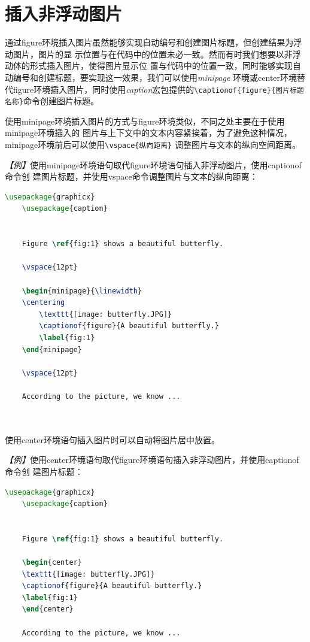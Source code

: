 \section{插入非浮动图片}

通过figure环境插入图片虽然能够实现自动编号和创建图片标题，但创建结果为浮动图片，图片的显
示位置与在代码中的位置未必一致。然而有时我们想要以非浮动体的形式插入图片，使得图片显示位
置与代码中的位置一致，同时能够实现自动编号和创建标题，要实现这一效果，我们可以使用\emph{minipage}
环境或center环境替代figure环境插入图片，同时使用\emph{caption}宏包提供的\texttt{\textbackslash{}captionof\{figure\}\{图片标题名称\}}命令创建图片标题。

使用minipage环境插入图片的方式与figure环境类似，不同之处主要在于使用minipage环境插入的
图片与上下文中的文本内容紧挨着，为了避免这种情况，minipage环境前后可以使用\texttt{\textbackslash{}vspace\{纵向距离\}}
调整图片与文本的纵向空间距离。

\emph{【例】}使用minipage环境语句取代figure环境语句插入非浮动图片，使用captionof命令创
建图片标题，并使用vspace命令调整图片与文本的纵向距离：
\begin{lstlisting}[language=TeX]
    \usepackage{graphicx}
    \usepackage{caption}
    

    Figure \ref{fig:1} shows a beautiful butterfly.

    \vspace{12pt}

    \begin{minipage}{\linewidth}
    \centering
        \texttt{[image: butterfly.JPG]}
        \captionof{figure}{A beautiful butterfly.}
        \label{fig:1}
    \end{minipage}

    \vspace{12pt}

    According to the picture, we know ...

    
\end{lstlisting}

使用center环境语句插入图片时可以自动将图片居中放置。

\emph{【例】}使用center环境语句取代figure环境语句插入非浮动图片，并使用captionof命令创
建图片标题：
\begin{lstlisting}[language=TeX]
    \usepackage{graphicx}
    \usepackage{caption}
    

    Figure \ref{fig:1} shows a beautiful butterfly.

    \begin{center}
    \texttt{[image: butterfly.JPG]}
    \captionof{figure}{A beautiful butterfly.}
    \label{fig:1}
    \end{center}

    According to the picture, we know ...

    
\end{lstlisting}

